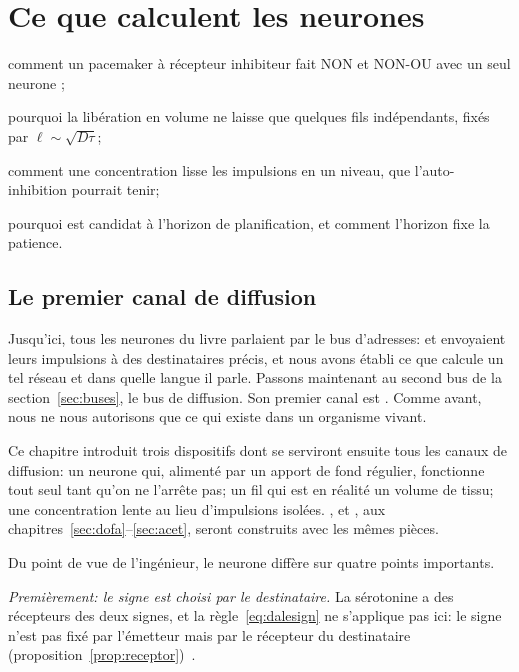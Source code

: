 \chapter{Ce que calculent les neurones }
\label{sec:serocomputer}
\begin{chaptergoals}
\item comment un pacemaker à récepteur inhibiteur fait NON et NON-OU avec un seul neurone ;
\item pourquoi la libération en volume ne laisse que quelques fils indépendants, fixés par $\ell\sim\sqrt{D\tau}$;
\item comment une concentration lisse les impulsions en un niveau, que l'auto-inhibition pourrait tenir;
\item pourquoi  est candidat à l'horizon de planification, et comment l'horizon fixe la patience.
\end{chaptergoals}

\section{Le premier canal de diffusion}

Jusqu'ici, tous les neurones du livre parlaient par le bus d'adresses:  et  envoyaient leurs impulsions à des destinataires précis, et nous avons établi ce que calcule un tel réseau et dans quelle langue il parle. Passons maintenant au second bus de la section~\ref{sec:buses}, le bus de diffusion. Son premier canal est . Comme avant, nous ne nous autorisons que ce qui existe dans un organisme vivant.

Ce chapitre introduit trois dispositifs dont se serviront ensuite tous les canaux de diffusion: un neurone qui, alimenté par un apport de fond régulier, fonctionne tout seul tant qu'on ne l'arrête pas; un fil qui est en réalité un volume de tissu; une concentration lente au lieu d'impulsions isolées. ,  et , aux chapitres~\ref{sec:dofa}--\ref{sec:acet}, seront construits avec les mêmes pièces.

Du point de vue de l'ingénieur, le neurone  diffère sur quatre points importants.

\emph{Premièrement: le signe est choisi par le destinataire.} La sérotonine a des récepteurs des deux signes, et la règle~\eqref{eq:dalesign} ne s'applique pas ici: le signe n'est pas fixé par l'émetteur mais par le récepteur du destinataire (proposition~\ref{prop:receptor})~\cite{BarnesSharp1999}.

